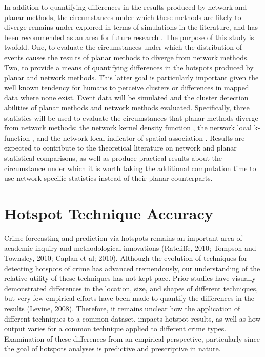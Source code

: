 \documentclass[12pt, letterpaper]{article}
\begin{document}
In addition to quantifying differences in the results produced by network and planar methods, the circumstances under which these methods are likely to diverge remains under-explored in terms of simulations in the literature, and has been recommended as an area for future research \citep{luchen2007false, borruso2008network}. The purpose of this study is twofold. One, to evaluate the circumstances under which the distribution of events causes the results of planar methods to diverge from network methods. Two, to provide a means of quantifying differences in the hotspots produced by planar and network methods. This latter goal is particularly important given the well known tendency for humans to perceive clusters or differences in mapped data where none exist. Event data will be simulated and the cluster detection abilities of planar methods and network methods evaluated. Specifically, three statistics will be used to evaluate the circumstances that planar methods diverge from network methods: the network kernel density function \citep{okabe2009kernel}, the network local k-function \citep{yamada2007local}, and the network local indicator of spatial association \citep{yamada2010local}. Results are expected to contribute to the theoretical literature on network and planar statistical comparisons, as well as produce practical results about the circumstance under which it is worth taking the additional computation time to use network specific statistics instead of their planar counterparts.


\section{Hotspot Technique Accuracy}%

Crime forecasting and prediction via hotspots remains an important area of academic inquiry and methodological innovations (Ratcliffe, 2010;  Tompson and Townsley, 2010; Caplan et al; 2010). Although the evolution of techniques for detecting hotspots of crime has advanced tremendously, our understanding of the relative utility of these techniques has not kept pace. Prior studies have visually demonstrated differences in the location, size, and shapes of different techniques, but very few empirical efforts have been made to quantify the differences in the results \citep{chainey2008utility} (Levine, 2008). Therefore, it remains unclear how the application of different techniques to a common dataset, impacts hotspot results, as well as how output varies for a common technique applied to different crime types. Examination of these differences from an empirical perspective, particularly since the goal of hotspots analyses is predictive and prescriptive in nature. 
\end{document}
